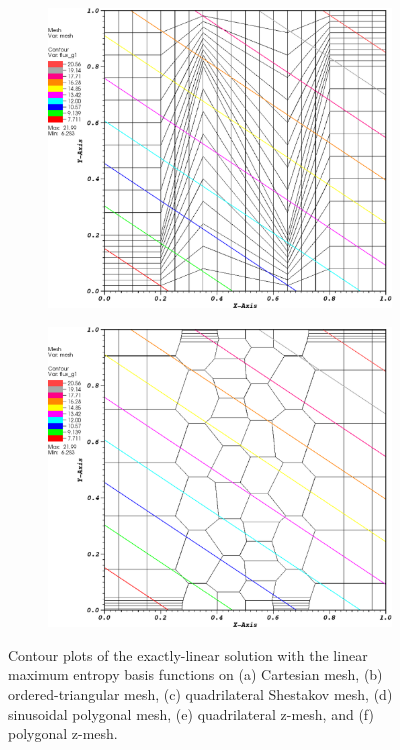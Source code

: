 \begin{figure}
\begin{subfigure}[b]{0.45\textwidth}
		\caption{}
	\end{subfigure}
	\vfill
	\begin{subfigure}[b]{0.45\textwidth}
		\centering
		\label{subfig::z_quad_me_k1_lin_sol}
		\includegraphics[width=\textwidth]{figures/sec_BF/z_quad_MAXENT_k1.eps}
		\caption{}
	\end{subfigure}
	\hfill
	\begin{subfigure}[b]{0.45\textwidth}
		\centering
		\label{subfig::z_poly_me_k1_lin_sol}
		\includegraphics[width=\textwidth]{figures/sec_BF/z_poly_MAXENT_k1.eps}
		\caption{}
	\end{subfigure}
\caption{Contour plots of the exactly-linear solution with the linear maximum entropy basis functions on (a) Cartesian mesh, (b) ordered-triangular mesh, (c) quadrilateral Shestakov mesh, (d) sinusoidal polygonal mesh, (e) quadrilateral z-mesh, and (f) polygonal z-mesh.}
\label{fig::BF_Results_Linear_me1_sol}
\end{figure}


